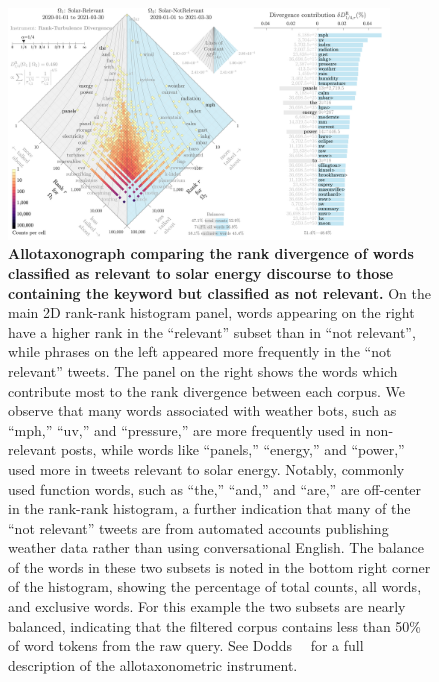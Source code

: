 







\begin{figure}
  \centering	
    \includegraphics[width=0.90\textwidth]{figures/figallotaxonometer9000-2021-03-30-2021-03-30-rank-div-alpha-third-Solar_Solar_noname.png}  
  \caption{\textbf{Allotaxonograph comparing the rank divergence of words
    classified as relevant to solar energy discourse
    to those containing the keyword 
    but classified as not relevant.} 
    On the main 2D rank-rank histogram panel,
    words appearing on the right have a higher rank in the ``relevant'' subset than in ``not relevant'', while phrases on the left appeared more frequently in the ``not relevant'' tweets.
    The panel on the right shows the words which contribute most to the rank divergence between each corpus.
    We observe that many words associated with weather bots,
    such as ``mph,'' ``uv,'' and ``pressure,'' 
    are more frequently used in non-relevant posts,
    while words like ``panels,'' ``energy,'' and ``power,'' used more in tweets relevant to solar energy.
    Notably, commonly used function words,
    such as ``the,'' ``and,'' and ``are,'' 
    are off-center in the rank-rank histogram, a further indication that many of the ``not relevant'' tweets are from automated accounts publishing weather data rather than using conversational English.
    The balance of the words in these two subsets is noted in the bottom right corner of the histogram, showing the percentage of total counts, all words, and exclusive words. 
    For this example the two subsets are nearly balanced, indicating that the filtered corpus contains less than 50\% of word tokens from the raw query.
    See Dodds~\etal~\cite{dodds2020allotaxonometry} for a full description of the allotaxonometric instrument.}
    \label{fig:rankdiv_solar}
\end{figure}


